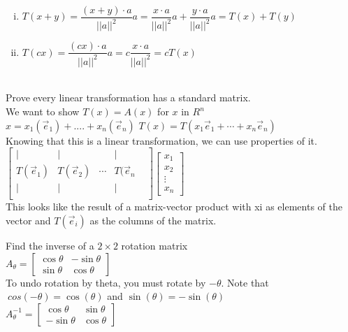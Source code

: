 \documentclass[12pt]{article}
\begin{document}
\begin{enumerate}[(i)]
\item $T(x+y) = \dfrac{(x+y) \cdot a}{||a||^2} a = \dfrac{x \cdot a}{||a||^2}a + \dfrac{y \cdot a}{||a||^2 }a = T(x) + T(y)$
\item $T(cx) = \dfrac{(cx) \cdot a}{||a||^2} a = c \dfrac{x \cdot a}{||a||^2} = cT(x)$
\end{enumerate}
\textbf{}\\

Prove every linear transformation has a standard matrix.\\
We want to show $T(x) = A(x)$ for $x$ in $R^n$\\
$x = x_1(\overrightarrow{e}_1)+....+x_n(\overrightarrow{e}_n)$
$T(x) = T(x_1 \overrightarrow{e}_1+ \cdots +x_n \overrightarrow{e}_n)$\\
Knowing that this is a linear transformation, we can use properties of it.\\
$\begin{bmatrix}
|&|&&|&\\
T(\overrightarrow{e}_1) & T(\overrightarrow{e}_2) & \cdots & T(\overrightarrow{e}_n \\
|&|&&|&\\
\end{bmatrix} \begin{bmatrix}
x_1\\
x_2\\
\vdots\\
x_n
\end{bmatrix}$\\
This looks like the result of a matrix-vector product with xi as elements of the vector and $T(\overrightarrow{e}_i)$ as the columns of the matrix.

Find the inverse of a $2 \times 2$ rotation matrix\\
$A_\theta = \begin{bmatrix}
\cos \theta & - \sin \theta\\
\sin \theta & \cos \theta
\end{bmatrix} $\\
To undo rotation by theta, you must rotate by $-\theta$. Note that $\ cos(- \theta) = \cos(\theta)$ and $\sin(\theta) = -\sin(\theta)$\\
$A_\theta^{-1} = \begin{bmatrix}
\cos \theta & \sin \theta\\
-\sin \theta & \cos \theta
\end{bmatrix} $\\
\end{document}
